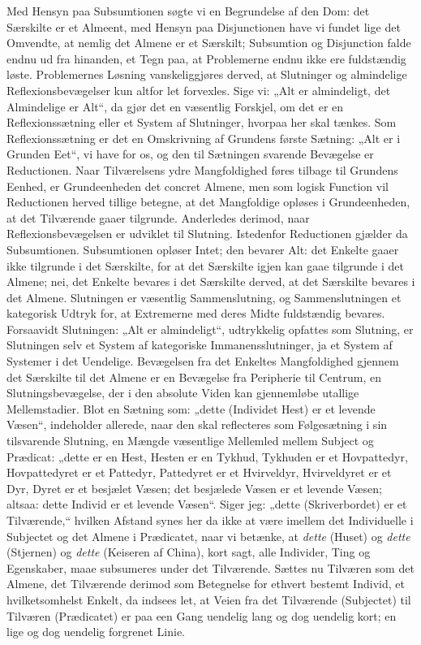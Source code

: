 \documentclass[12pt]{book}
\newcommand{\opage}[1]{\marginnote{\footnotesize\textit{[#1]}}}
\begin{document}
Med Hensyn paa Subsumtionen søgte vi en Begrundelse af den Dom: det Særskilte er et Almeent, med Hensyn paa Disjunctionen have vi fundet lige det Omvendte, at nemlig det
\opage{353}Almene er et Særskilt; Subsumtion og Disjunction falde endnu ud fra hinanden, et Tegn paa, at Problemerne endnu ikke ere fuldstændig løste. Problemernes Løsning vanskeliggjøres derved, at Slutninger og almindelige Reflexionsbevægelser kun altfor let forvexles. Sige vi: „Alt er almindeligt, det Almindelige er Alt“, da gjør det en væsentlig Forskjel, om det er en Reflexionssætning eller et System af Slutninger, hvorpaa her skal tænkes. Som Reflexionssætning er det en Omskrivning af Grundens første Sætning: „Alt er i Grunden Eet“, vi have for os, og den til Sætningen svarende Bevægelse er Reductionen. Naar Tilværelsens ydre Mangfoldighed føres tilbage til Grundens Eenhed, er Grundeenheden det concret Almene, men som logisk Function vil Reductionen herved tillige betegne, at det Mangfoldige opløses i Grundeenheden, at det Tilværende gaaer tilgrunde. Anderledes derimod, naar Reflexionsbevægelsen er udviklet til Slutning. Istedenfor Reductionen gjælder da Subsumtionen. Subsumtionen opløser Intet; den bevarer Alt: det Enkelte gaaer ikke tilgrunde i det Særskilte, for at det Særskilte igjen kan gaae tilgrunde i det Almene; nei, det Enkelte bevares i det Særskilte derved, at det Særskilte bevares i det Almene. Slutningen er væsentlig Sammenslutning, og Sammenslutningen et kategorisk Udtryk for, at Extremerne med deres Midte fuldstændig bevares. Forsaavidt Slutningen: „Alt er almindeligt“, udtrykkelig opfattes som Slutning, er Slutningen selv et System af kategoriske Immanensslutninger, ja et System af Systemer i det Uendelige. Bevægelsen fra det Enkeltes Mangfoldighed gjennem det Særskilte til det Almene er en Bevægelse fra Peripherie til Centrum, en Slutningsbevægelse, der i den absolute Viden kan gjennemløbe utallige Mellemstadier. Blot en Sætning som: „dette (Individet Hest) er et levende Væsen“, indeholder allerede, naar den skal reflecteres som Følgesætning i sin tilsvarende Slutning, en Mængde væsentlige Mellemled mellem Subject og Prædicat: „dette er
\opage{354}en Hest, Hesten er en Tykhud, Tykhuden er et Hovpattedyr, Hovpattedyret er et Pattedyr, Pattedyret er et Hvirveldyr, Hvirveldyret er et Dyr, Dyret er et besjælet Væsen; det besjælede Væsen er et levende Væsen; altsaa: dette Individ er et levende Væsen“. Siger jeg: „dette (Skriverbordet) er et Tilværende,“ hvilken Afstand synes her da ikke at være imellem det Individuelle i Subjectet og det Almene i Prædicatet, naar vi betænke, at \emph{dette} (Huset) og \emph{dette} (Stjernen) og \emph{dette} (Keiseren af China), kort sagt, alle Individer, Ting og Egenskaber, maae subsumeres under det Tilværende. Sættes nu Tilværen som det Almene, det Tilværende derimod som Betegnelse for ethvert bestemt Individ, et hvilketsomhelst Enkelt, da indsees let, at Veien fra det Tilværende (Subjectet) til Tilværen (Prædicatet) er paa een Gang uendelig lang og dog uendelig kort; en lige og dog uendelig forgrenet Linie.
\end{document}
